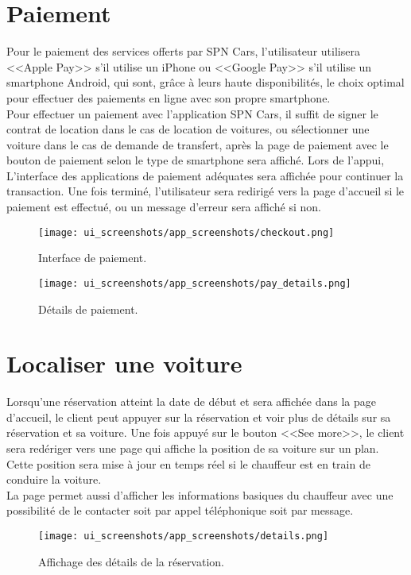 \section{Paiement}
Pour le paiement des services offerts par SPN Cars, l'utilisateur utilisera <<Apple Pay>> s'il utilise un iPhone ou <<Google Pay>> s'il utilise un smartphone Android, qui sont, grâce à leurs haute disponibilités, le choix optimal pour effectuer des paiements en ligne avec son propre smartphone.\\
Pour effectuer un paiement avec l'application SPN Cars, il suffit de signer le contrat de location dans le cas de location de voitures, ou sélectionner une voiture dans le cas de demande de transfert, après la page de paiement avec le bouton de paiement selon le type de smartphone sera affiché. Lors de l'appui, L'interface des applications de paiement adéquates sera affichée pour continuer la transaction. Une fois terminé, l'utilisateur sera redirigé vers la page d'accueil si le paiement est effectué, ou un message d'erreur sera affiché si non.
\vspace{1cm}

\begin{multicols}{2}
    \begin{figure}[H]
        \centering
        \texttt{[image: ui\_screenshots/app\_screenshots/checkout.png]}
        \captionsetup{justification=centering}
        \caption{Interface de paiement.}
        \label{fig:checkout}
    \end{figure}
    \begin{figure}[H]
        \centering
        \texttt{[image: ui\_screenshots/app\_screenshots/pay\_details.png]}
        \captionsetup{justification=centering}
        \caption{Détails de paiement.}
        \label{fig:pay_details}
    \end{figure}
\end{multicols}
\section{Localiser une voiture}
Lorsqu'une réservation atteint la date de début et sera affichée dans la page d'accueil, le client peut appuyer sur la réservation et voir plus de détails sur sa réservation et sa voiture. Une fois appuyé sur le bouton <<See more>>, le client sera redériger vers une page qui affiche la position de sa voiture sur un plan. Cette position sera mise à jour en temps réel si le chauffeur est en train de conduire la voiture.\\
\noindent La page permet aussi d'afficher les informations basiques du chauffeur avec une possibilité de le contacter soit par appel téléphonique soit par message.
\begin{figure}[H]
    \centering
    \texttt{[image: ui\_screenshots/app\_screenshots/details.png]}
    \captionsetup{justification=centering}
    \caption{Affichage des détails de la réservation.}
    \label{fig:res_details}
\end{figure}
